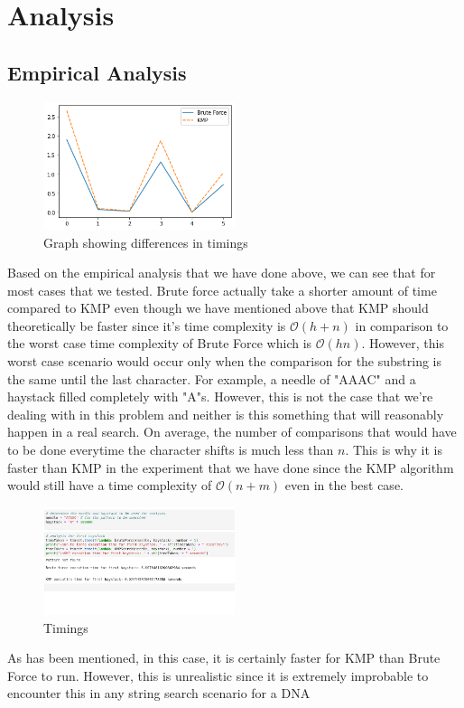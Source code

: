 \section*{Analysis}
\subsection*{Empirical Analysis}

\begin{figure}[h!]
    \centering
    \includegraphics[width=0.50\textwidth]{images/swaggy_graph.png}
    \caption{Graph showing differences in timings}
\end{figure}

Based on the empirical analysis that we have done above, we can see that for most cases that we tested. Brute force actually take a shorter amount of time compared to KMP even though we have mentioned above that KMP should theoretically be faster since it's time complexity is $\mathcal{O}(h+n)$ in comparison to the worst case time complexity of Brute Force which is $\mathcal{O}(hn)$. However, this worst case scenario would occur only when the comparison for the substring is the same until the last character. For example, a needle of "AAAC" and a haystack filled completely with "A"s. However, this is not the case that we're dealing with in this problem and neither is this something that will reasonably happen in a real search. On average, the number of comparisons that would have to be done everytime the character shifts is much less than $n$. This is why it is faster than KMP in the experiment that we have done since the KMP algorithm would still have a time complexity of $\mathcal{O}(n+m)$ even in the best case.

\begin{figure}[h!]
    \centering
    \includegraphics[width=0.50\textwidth]{images/worst_case.png}
    \caption{Timings}
\end{figure}

As has been mentioned, in this case, it is certainly faster for KMP than Brute Force to run. However, this is unrealistic since it is extremely improbable to encounter this in any string search scenario for a DNA